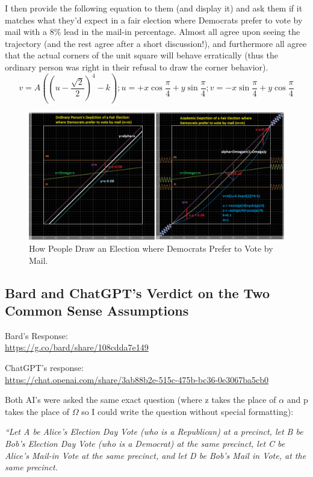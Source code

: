 I then provide the following equation to them (and display it) and ask them if it matches what they'd expect in a fair election where Democrats prefer to vote by mail with a 8\% lead in the mail-in percentage. Almost all agree upon seeing the trajectory (and the rest agree after a short discussion!), and furthermore all agree that the actual corners of the unit square will behave erratically (thus the ordinary person was right in their refusal to draw the corner behavior).
$$v=A\left(\left(u-\frac{\sqrt{2}}{2}\right)^4-k\right); u=+x\cos{\frac{\pi}{4}}+y\sin{\frac{\pi}{4}}; v=-x\sin{\frac{\pi}{4}}+y\cos{\frac{\pi}{4}}$$
\begin{figure}[bp!]
\begin{center}
\caption{How People Draw an Election where Democrats Prefer to Vote by Mail.}
\includegraphics[width=350pt]{Fifth Grader vs Grad.png}
\end{center}
\end{figure}
\newpage
\subsection{Bard and ChatGPT's Verdict on the Two Common Sense Assumptions}
Bard's Response:\\
\url{https://g.co/bard/share/108cdda7e149}

ChatGPT's response:\\
\url{https://chat.openai.com/share/3ab88b2e-515c-475b-bc36-0e3067ba5cb0}

Both AI's were asked the same exact question (where z takes the place of $\alpha$ and p takes the place of $\Omega$ so I could write the question without special formatting):

\textit{``Let A be Alice's Election Day Vote (who is a Republican) at a precinct, let B be Bob's Election Day Vote (who is a Democrat) at the same precinct, let C be Alice's Mail-in Vote at the same precinct, and let D be Bob's Mail in Vote, at the same precinct.}

